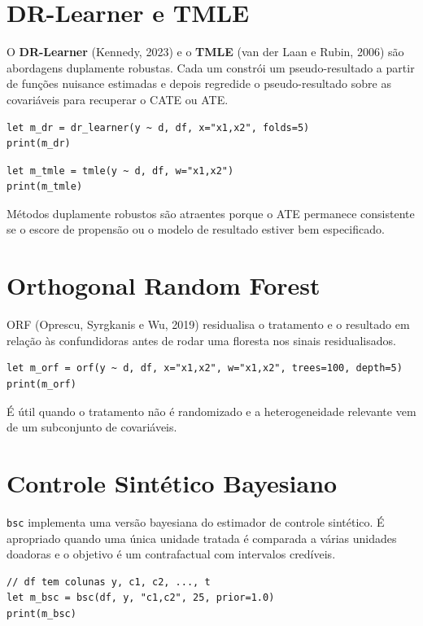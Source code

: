 \section{DR-Learner e TMLE}

O \textbf{DR-Learner} (Kennedy, 2023) e o \textbf{TMLE} (van der Laan e
Rubin, 2006) são abordagens duplamente robustas. Cada um constrói um
pseudo-resultado a partir de funções nuisance estimadas e depois
regredide o pseudo-resultado sobre as covariáveis para recuperar o CATE
ou ATE.

\begin{lstlisting}[caption={DR-Learner}]
let m_dr = dr_learner(y ~ d, df, x="x1,x2", folds=5)
print(m_dr)
\end{lstlisting}

\begin{lstlisting}[caption={TMLE}]
let m_tmle = tmle(y ~ d, df, w="x1,x2")
print(m_tmle)
\end{lstlisting}

Métodos duplamente robustos são atraentes porque o ATE permanece
consistente se o escore de propensão ou o modelo de resultado estiver
bem especificado.

\section{Orthogonal Random Forest}

ORF (Oprescu, Syrgkanis e Wu, 2019) residualisa o tratamento e o
resultado em relação às confundidoras antes de rodar uma floresta nos
sinais residualisados.

\begin{lstlisting}[caption={Orthogonal Random Forest}]
let m_orf = orf(y ~ d, df, x="x1,x2", w="x1,x2", trees=100, depth=5)
print(m_orf)
\end{lstlisting}

É útil quando o tratamento não é randomizado e a heterogeneidade
relevante vem de um subconjunto de covariáveis.

\section{Controle Sintético Bayesiano}

\texttt{bsc} implementa uma versão bayesiana do estimador de controle
sintético. É apropriado quando uma única unidade tratada é comparada a
várias unidades doadoras e o objetivo é um contrafactual com
intervalos credíveis.

\begin{lstlisting}[caption={Controle Sintético Bayesiano}]
// df tem colunas y, c1, c2, ..., t
let m_bsc = bsc(df, y, "c1,c2", 25, prior=1.0)
print(m_bsc)
\end{lstlisting}


